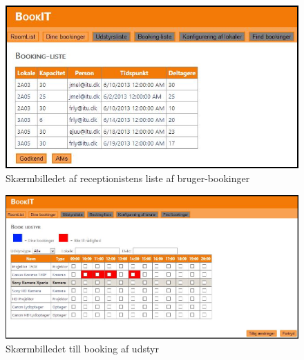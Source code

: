 \begin{figure}[h!]
  \centering
    \includegraphics[width=\textwidth]{Appendix/GUI-Prototype/DigitalMockup/BookingListe}
  \caption{Skærmbilledet af receptionistens liste af bruger-bookinger}
\label{App_GUI_final_BookingListe}
\end{figure}

\begin{figure}[h!]
  \centering
    \includegraphics[width=\textwidth]{Appendix/GUI-Prototype/DigitalMockup/BookEquip}
  \caption{Skærmbilledet till booking af udstyr}
\label{App_GUI_final_BookEquip}
\end{figure}

